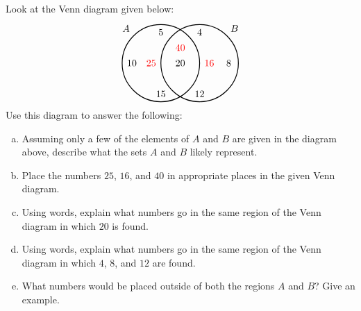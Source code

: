 \documentclass[11pt,letterpaper]{article}
\begin{document}
 Look at the Venn diagram given below:
	\[
	\begin{tikzpicture}[scale=0.7]
	\draw[line width=0.03cm] (-1,0) circle (2);
	\draw[line width=0.03cm] (1,0) circle (2);
	\node at (-2.8,1.8) {$A$}; 
	\node at (-1,1.6) {$5$}; \node at (-2.5,0) {$10$}; \node at (-1,-1.6) {$15$};
	\node at (2.8,1.8) {$B$};
	\node at (1,1.6) {$4$}; \node at (2.5,0) {$8$}; \node at (1,-1.6) {$12$};
	\node at (0,0) {$20$};
	
	\node at (-1.5,0) {\color{red}\bfseries$25$};
	\node at (1.5,0) {\color{red}\bfseries$16$};
	\node at (0,0.8) {\color{red}\bfseries$40$};
	\end{tikzpicture}
	\]
Use this diagram to answer the following:
	\begin{enumerate}[(a)]
	\item Assuming only a few of the elements of $A$ and $B$ are given in the diagram above, describe what the sets $A$ and $B$ likely represent.
	\item Place the numbers $25$, $16$, and $40$ in appropriate places in the given Venn diagram. 
	\item Using words, explain what numbers go in the same region of the Venn diagram in which $20$ is found.
	\item Using words, explain what numbers go in the same region of the Venn diagram in which $4$, $8$, and $12$ are found.
	\item What numbers would be placed outside of both the regions $A$ and $B$? Give an example.  
	\end{enumerate} \pspace
\end{document}
